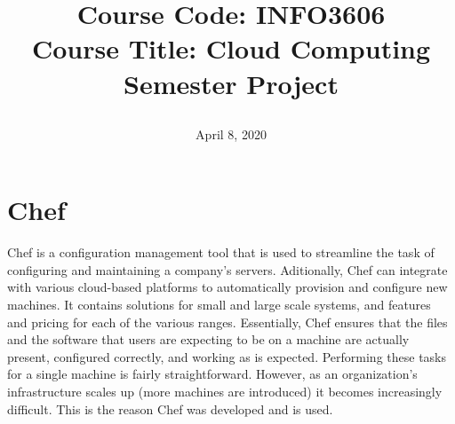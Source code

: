 \documentclass[a4paper, 12pt]{article}
\begin{document}
\title{
		\textbf{Course Code:} INFO3606\\
		\textbf{Course Title:} Cloud Computing\\
		\textbf{Semester Project}
		\date{April 8, 2020}
}
\maketitle

\newpage
{}

\tableofcontents

\newpage
\section{Chef}
Chef is a configuration management tool that is used to streamline the task of configuring and maintaining a company's servers. Aditionally, Chef can integrate with various cloud-based platforms to automatically provision and configure new machines. It contains solutions for small and large scale systems, and features and pricing for each of the various ranges. Essentially, Chef ensures that the files and the software that users are expecting to be on a machine are actually present, configured correctly, and working as is expected. Performing these tasks for a single machine is fairly straightforward. However, as an organization's infrastructure scales up (more machines are introduced) it becomes increasingly difficult. This is the reason Chef was developed and is used.
\end{document}
